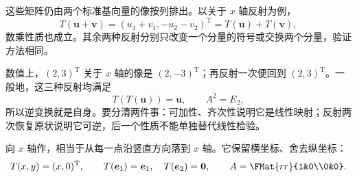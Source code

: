 \documentclass[a4paper,12pt,twoside,openany,fontset=none]{ctexbook}
\numberwithin{equation}{chapter}
\begin{document}
这些矩阵仍由两个标准基向量的像按列排出。以关于 $x$ 轴反射为例，
\[
 T(\boldsymbol u+\boldsymbol v)
 =(u_1+v_1,-u_2-v_2)^{\mathrm T}
 =T(\boldsymbol u)+T(\boldsymbol v),
\]
数乘性质也成立。其余两种反射分别只改变一个分量的符号或交换两个分量，验证方法相同。

数值上，$(2,3)^{\mathrm T}$ 关于 $x$ 轴的像是 $(2,-3)^{\mathrm T}$；再反射一次便回到 $(2,3)^{\mathrm T}$。一般地，这三种反射均满足
\[
 T(T(\boldsymbol u))=\boldsymbol u,\qquad A^2=E_2,
\]
所以逆变换就是自身。要分清两件事：可加性、齐次性说明它是线性映射；反射两次恢复原状说明它可逆，后一个性质不能单独替代线性检验。

向 $x$ 轴作，相当于从每一点沿竖直方向落到 $x$ 轴。它保留横坐标、舍去纵坐标：
\[
 T(x,y)=(x,0)^{\mathrm T},\qquad
 T(\boldsymbol e_1)=\boldsymbol e_1,\quad T(\boldsymbol e_2)=\boldsymbol0,
 \qquad A=\FMat{rr}{1&0\\0&0}.
\]
\end{document}
